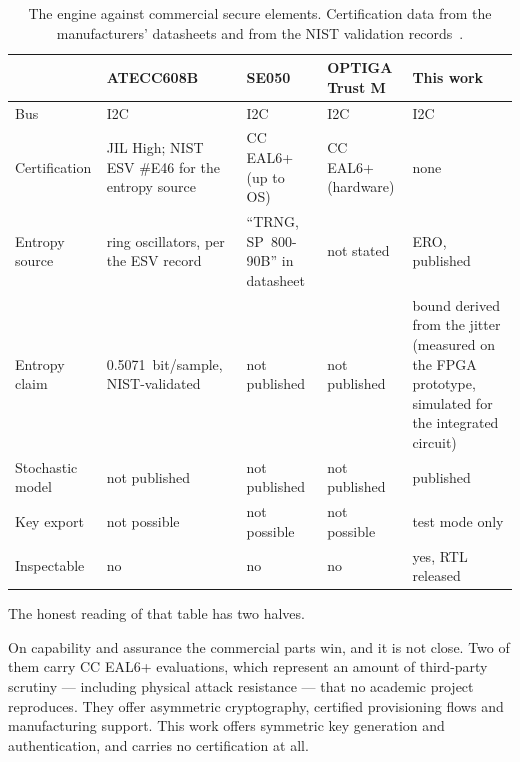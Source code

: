 \begin{table}[htbp]
\centering
\caption{The engine against commercial secure elements. Certification
data from the manufacturers' datasheets and from the NIST validation
records~\cite{microchip_atecc608b_ds, nist_esv_e46, nxp_se050_ds,
infineon_optiga_trustm_ds}.}
\label{tab:se}
\small
\begin{tabular}{@{}lp{2.6cm}p{2.4cm}p{2.2cm}p{2.6cm}@{}}
\toprule
 & ATECC608B & SE050 & OPTIGA Trust M & This work \\
\midrule
Bus            & \ac{I2C} & \ac{I2C} & \ac{I2C} & \ac{I2C} \\
Certification  & JIL High; NIST ESV \#E46 for the entropy source & CC EAL6+ (up to OS) & CC EAL6+ (hardware) & none \\
Entropy source & ring oscillators, per the ESV record & ``TRNG, SP~800-90B'' in datasheet & not stated & \ac{ERO}, published \\
Entropy claim  & 0.5071~bit/sample, NIST-validated & not published & not published & bound derived from the jitter (measured on the \ac{FPGA} prototype, simulated for the integrated circuit) \\
Stochastic model & not published & not published & not published & published \\
Key export     & not possible & not possible & not possible & test mode only \\
Inspectable    & no & no & no & yes, \ac{RTL} released \\
\bottomrule
\end{tabular}
\end{table}

The honest reading of that table has two halves.

On capability and assurance the commercial parts win, and it is not close.
Two of them carry CC EAL6+ evaluations, which represent an amount of
third-party scrutiny --- including physical attack resistance --- that no
academic project reproduces. They offer asymmetric cryptography, certified
provisioning flows and manufacturing support. This work offers symmetric
key generation and authentication, and carries no certification at all.

